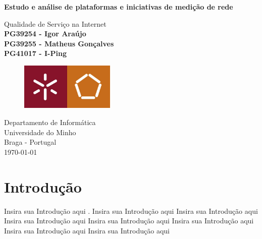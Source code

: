 \documentclass{llncs}
\begin{document}
\begin{titlepage}           
\end{titlepage}
\begin{titlepage}
  \begin{center}
    \vspace*{1cm}
    \Huge
    \textbf{Estudo e análise de plataformas e iniciativas de medição de rede}
    \vspace{0.5cm}
    
    \LARGE
    Qualidade de Serviço na Internet
    \vspace{1.0cm}
    \small
    \textbf{\\PG39254 - Igor Araújo\\PG39255 - Matheus Gonçalves\\PG41017 - I-Ping}
    
    \vspace{1.0cm}
    \begin{figure}[h]
    \includegraphics[width=0.4\textwidth]{uminho.jpg}
    \centering
    \end{figure}
    
    \vspace{4.5cm}
    Departamento de Informática\\
    Universidade do Minho\\
    Braga - Portugal\\
    \today
          
  \end{center}
\end{titlepage}

\tableofcontents

\clearpage

\section{Introdução}

%
Insira sua Introdução aqui \cite{deb:agra}. Insira sua Introdução aqui  Insira sua Introdução aqui   Insira sua Introdução aqui   Insira sua Introdução aqui   Insira sua Introdução aqui   Insira sua Introdução aqui   Insira sua Introdução aqui  
\end{document}
